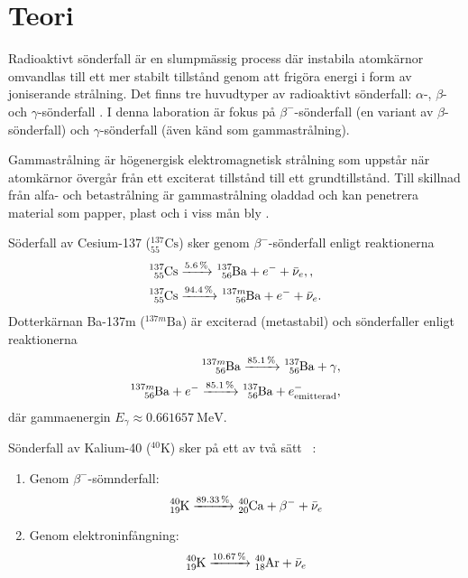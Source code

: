 \section{Teori} \label{sec:theory}

Radioaktivt sönderfall är en slumpmässig process där instabila atomkärnor
omvandlas till ett mer stabilt tillstånd genom att frigöra energi i form av
joniserande strålning. Det finns tre huvudtyper av radioaktivt sönderfall:
$\alpha$-, $\beta$- och $\gamma$-sönderfall \parencite{yf}. I denna laboration
är fokus på $\beta^-$-sönderfall (en variant av $\beta$-sönderfall) och
$\gamma$-sönderfall (även känd som gammastrålning).

Gammastrålning är högenergisk elektromagnetisk strålning som uppstår när
atomkärnor övergår från ett exciterat tillstånd till ett grundtillstånd. Till
skillnad från alfa- och betastrålning är gammastrålning oladdad och kan
penetrera material som papper, plast och i viss mån bly
\parencite{spectrometry}.

Söderfall av Cesium-137 ($^{137}_{55}\text{Cs}$) sker genom
$\beta^-$-sönderfall enligt reaktionerna
%
\begin{align}
    \ce{^137_55Cs} &\xrightarrow{\qty{5.6}{\percent}}  \ce{^137_56Ba} + e^- + \bar{\nu}_e,   \label{eq:csdecay1}, \\
    \ce{^137_55Cs} &\xrightarrow{\qty{94.4}{\percent}} \ce{^{137m}_56Ba} + e^- + \bar{\nu}_e \label{eq:csdecay2}.
\end{align}
%
Dotterkärnan Ba-137m ($^{137m}\text{Ba}$) är exciterad (metastabil) och
sönderfaller enligt reaktionerna
%
\begin{align}
    \ce{^{137m}_56Ba} \xrightarrow{\qty{85.1}{\percent}} \ce{^137_56Ba} + \gamma                     \label{eq:badecay1}, \\
    \ce{^{137m}_56Ba} + e^- \xrightarrow{\qty{85.1}{\percent}} \ce{^137_56Ba} + e^-_\text{emitterad} \label{eq:badecay2},
\end{align}
%
där gammaenergin $E_\gamma \approx \qty{0.661657}{\MeV}$.

Sönderfall av Kalium-40 ($^{40}\text{K}$) sker på ett av två sätt
\parencite{nuclear}~\parencite{instructions}:
%
\begin{enumerate}
    \item Genom $\beta^-$-sömnderfall:
    \begin{equation}
        \ce{^40_19K} \xrightarrow{\qty{89.33}{\percent}} \ce{^40_20Ca} + \beta^- + \bar{\nu}_e \label{eq:kdecay1}
    \end{equation}

    \item Genom elektroninfångning:
    \begin{equation}
        \ce{^40_19K} \xrightarrow{\qty{10.67}{\percent}} \ce{^40_18Ar} + \bar{\nu}_e           \label{eq:kdecay2}
    \end{equation}
\end{enumerate}

